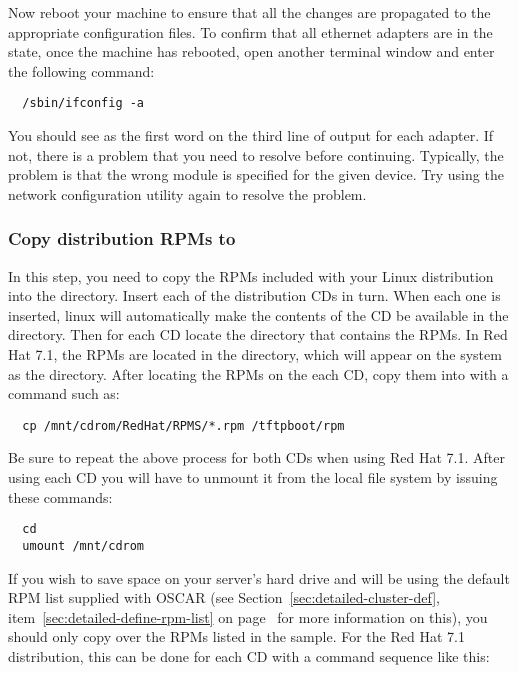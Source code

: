 Now reboot your machine to ensure that all the changes are propagated
to the appropriate configuration files. To confirm that all ethernet
adapters are in the  state, once the machine has rebooted,
open another terminal window and enter the following command:

\begin{verbatim}
  /sbin/ifconfig -a
\end{verbatim}
  
You should see  as the first word on the third line of output
for each adapter. If not, there is a problem that you need to resolve
before continuing. Typically, the problem is that the wrong module is
specified for the given device. Try using the network configuration
utility again to resolve the problem.
  
\subsubsection{Copy distribution RPMs to }

In this step, you need to copy the RPMs included with your Linux
distribution into the  directory. 
\begchange
Insert each of the distribution CDs in turn.
When each one is inserted, linux will automatically make the
contents of the CD be available in the  directory.
Then for each CD locate the directory that contains the RPMs.
In Red Hat 7.1, the RPMs are located in the 
directory, which will appear on the system as the 
 directory. 
\endchange
 After locating the RPMs on the each CD, copy them into
 with a command such as:

\begin{verbatim}
  cp /mnt/cdrom/RedHat/RPMS/*.rpm /tftpboot/rpm
\end{verbatim}
  
Be sure to repeat the above process for both CDs when using Red Hat
7.1.
\begchange
After using each CD you will have to unmount it from the local
file system by issuing these commands:

\begin{verbatim}
  cd
  umount /mnt/cdrom
\end{verbatim}
\endchange
If you wish to save space on your server's hard drive and will be
using the default RPM list supplied with OSCAR (see
Section~\ref{sec:detailed-cluster-def},
item~\ref{sec:detailed-define-rpm-list} on
page~\pageref{sec:detailed-define-rpm-list} for more information on
this), you should only copy over the RPMs listed in the sample.
\begchange
For the Red Hat 7.1 distribution, this can be done for each CD with
a command sequence like this:

